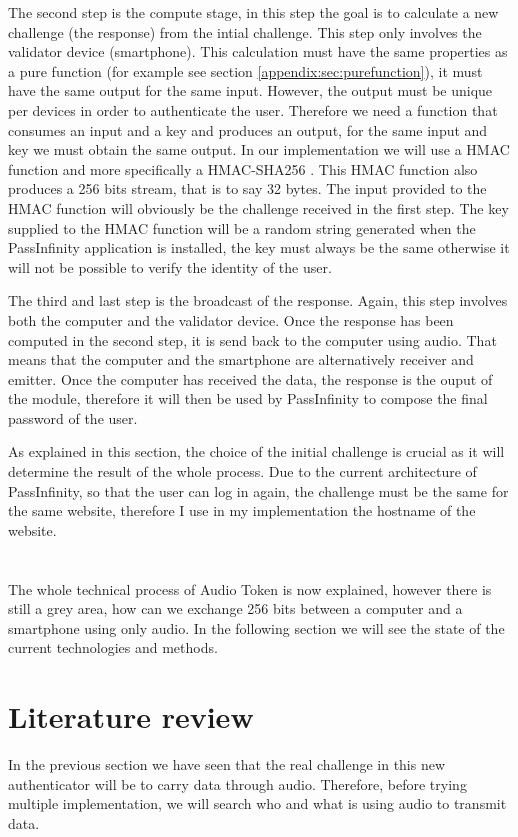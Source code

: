 \documentclass[twocolumn,14pt]{extarticle}
\begin{document}
The second step is the compute stage, in this step the goal is to calculate a new challenge (the response) from the intial challenge. This step only involves the validator device (smartphone). This calculation must have the same properties as a pure function (for example see section \ref{appendix:sec:purefunction}), it must have the same output for the same input. However, the output must be unique per devices in order to authenticate the user. Therefore we need a function that consumes an input and a key and produces an output, for the same input and key we must obtain the same output. In our implementation we will use a HMAC function and more specifically a HMAC-SHA256 \cite{wiki:HMAC}. This HMAC function also produces a 256 bits stream, that is to say 32 bytes. The input provided to the HMAC function will obviously be the challenge received in the first step. The key supplied to the HMAC function will be a random string generated when the PassInfinity application is installed, the key must always be the same otherwise it will not be possible to verify the identity of the user.

The third and last step is the broadcast of the response. Again, this step involves both the computer and the validator device. Once the response has been computed in the second step, it is send back to the computer using audio. That means that the computer and the smartphone are alternatively receiver and emitter. Once the computer has received the data, the response is the ouput of the module, therefore it will then be used by PassInfinity to compose the final password of the user.

As explained in this section, the choice of the initial challenge is crucial as it will determine the result of the whole process. Due to the current architecture of PassInfinity, so that the user can log in again, the challenge must be the same for the same website, therefore I use in my implementation the hostname of the website. 
\\
\\
\\
The whole technical process of Audio Token is now explained, however there is still a grey area, how can we exchange 256 bits between a computer and a smartphone using only audio. In the following section we will see the state of the current technologies and methods.

\section{Literature review}
In the previous section we have seen that the real challenge in this new authenticator will be to carry data through audio. Therefore, before trying multiple implementation, we will search who and what is using audio to transmit data.
\end{document}
